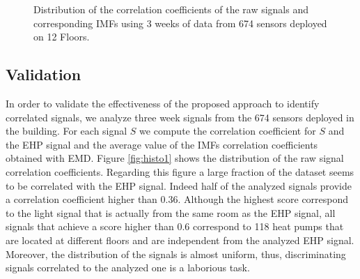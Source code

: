 \begin{figure}
\centering
 \caption{Distribution of the correlation coefficients of the raw signals and corresponding IMFs using 3 weeks of data from 674 sensors deployed on 12 Floors.}
\label{fig:histo}
\end{figure}

\subsection{Validation}


In order to validate the effectiveness of the proposed approach to identify correlated signals, we analyze three week signals from the 674 sensors deployed in the building.
For each signal $S$ we compute the correlation coefficient for $S$ and the EHP signal and the average value of the IMFs correlation coefficients obtained with EMD.
Figure \ref{fig:histo1} shows the distribution of the raw signal correlation coefficients.
Regarding this figure a large fraction of the dataset seems to be correlated with the EHP signal.
Indeed half of the analyzed signals provide a correlation coefficient higher than $0.36$.
Although the highest score correspond to the light signal that is actually from the same room as the EHP signal, all signals that achieve a score higher than $0.6$  correspond to 118 heat pumps that are located at different floors and are independent from the analyzed EHP signal.
Moreover, the distribution of the signals is almost uniform, thus, discriminating signals correlated to the analyzed one is a laborious task.

